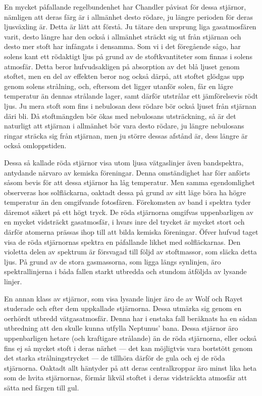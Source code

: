 \documentclass[a4paper, 12pt, oneside, swedish]{article}
\begin{document}
En mycket påfallande regelbundenhet har Chandler påvisat för dessa stjärnor, nämligen att deras färg är i allmänhet desto rödare, ju längre perioden för deras ljusväxling är. Detta är lätt att förstå. Ju tätare den ursprung liga gasatmosfären varit, desto längre har den också i allmänhet sträckt sig ut från stjärnan och desto mer stoft har infångats i densamma. Som vi i det föregående sågo, har solens kant ett rödaktigt ljus på grund av de stoftkvantiteter som finnas i solens atmosfär. Detta beror hufvudsakligen på absorption av det blå ljuset genom stoftet, men en del av effekten beror nog också därpå, att stoftet glödgas upp genom solens strålning, och, eftersom det ligger utanför solen, får en lägre temperatur än dennas strålande lager, samt därför utstrålar ett jämförelsevis rödt ljus. Ju mera stoft som fins i nebulosan dess rödare bör också ljuset från stjärnan däri bli. Då stoftmängden bör ökas med nebulosans utsträckning, så är det naturligt att stjärnan i allmänhet bör vara desto rödare, ju längre nebulosans ringar sträcka sig från stjärnan, men ju större dessas afstånd är, dess längre är också omloppstiden.

Dessa så kallade röda stjärnor visa utom ljusa vätgaslinjer även bandspektra, antydande närvaro av kemiska föreningar. Denna omständighet har förr anförts såsom bevis för att dessa stjärnor ha låg temperatur. Men samma egendomlighet observeras hos solfläckarna, oaktadt dessa på grund av sitt läge böra ha högre temperatur än den omgifvande fotosfären. Förekomsten av band i spektra tyder däremot säkert på ett högt tryck. De röda stjärnorna omgifvas uppenbarligen av en mycket vidsträckt gasatmosfär, i hvars inre del trycket är mycket stort och därför atomerna prässas ihop till att bilda kemiska föreningar. Öfver hufvud taget visa de röda stjärnornas spektra en påfallande likhet med solfläckarnas. Den violetta delen av spektrum är försvagad till följd av stoftmassor, som släcka detta ljus. På grund av de stora gasmassorna, som ligga längs synlinjen, äro spektrallinjerna i båda fallen starkt utbredda och stundom åtföljda av lysande linjer.

En annan klass av stjärnor, som visa lysande linjer äro de av Wolf och Rayet studerade och efter dem uppkallade stjärnorna. Dessa utmärka sig genom en oerhördt utbredd vätgasatmosfär. Denna har i enstaka fall beräknats ha en sådan utbredning att den skulle kunna utfylla Neptunus' bana. Dessa stjärnor äro uppenbarligen hetare (och kraftigare strålande) än de röda stjärnorna, eller också fins ej så mycket stoft i deras närhet --- det kan möjligtvis vara bortstött genom det starka strålningstrycket --- de tillhöra därför de gula och ej de röda stjärnorna. Oaktadt allt häntyder på att deras centralkroppar äro minst lika heta som de hvita stjärnornas, förmår likväl stoftet i deras vidsträckta atmosfär att sätta ned färgen till gul.
\end{document}
